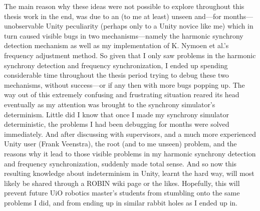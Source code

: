 The main reason why these ideas were not possible to explore throughout this thesis work in the end, was due to an (to me at least) unseen and—for months—unobservable Unity peculiarity (perhaps only to a Unity novice like me) which in turn caused visible bugs in two mechanisms—namely the harmonic synchrony detection mechanism as well as my implementation of K. Nymoen et al.'s frequency adjustment method. So given that I only saw problems in the harmonic synchrony detection and frequency synchronization, I ended up spending considerable time throughout the thesis period trying to debug these two mechanisms, without success—or if any then with more bugs popping up. The way out of this extremely confusing and frustrating situation reared its head eventually as my attention was brought to the synchrony simulator's determinism. Little did I know that once I made my synchrony simulator deterministic, the problems I had been debugging for months were solved immediately. And after discussing with supervisors, and a much more experienced Unity user (Frank Veenstra), the root (and to me unseen) problem, and the reasons why it lead to those visible problems in my harmonic synchrony detection and frequency synchronization, suddenly made total sense. And so now this resulting knowledge about indeterminism in Unity, learnt the hard way, will most likely be shared through a ROBIN wiki page or the likes. Hopefully, this will prevent future UiO robotics master's students from stumbling onto the same problems I did, and from ending up in similar rabbit holes as I ended up in.